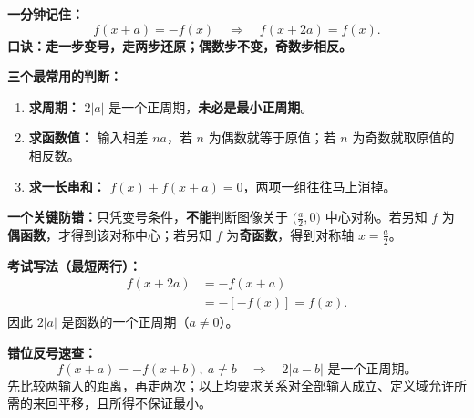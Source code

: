 \clearpage
\begin{summarybox}
\textbf{一分钟记住：}
\[
\boxed{\ f(x+a)=-f(x)\quad\Longrightarrow\quad f(x+2a)=f(x).\ }
\]
\textbf{口诀：走一步变号，走两步还原；偶数步不变，奇数步相反。}

\medskip
\textbf{三个最常用的判断：}
\begin{enumerate}[leftmargin=*,itemsep=0.3em]
\item \textbf{求周期：} $2|a|$ 是一个正周期，\textbf{未必是最小正周期}。
\item \textbf{求函数值：} 输入相差 $na$，若 $n$ 为偶数就等于原值；若 $n$ 为奇数就取原值的相反数。
\item \textbf{求一长串和：} $f(x)+f(x+a)=0$，两项一组往往马上消掉。
\end{enumerate}

\medskip
\textbf{一个关键防错：}只凭变号条件，\textbf{不能}判断图像关于 $\bigl(\frac a2,0\bigr)$ 中心对称。若另知 $f$ 为\textbf{偶函数}，才得到该对称中心；若另知 $f$ 为\textbf{奇函数}，得到对称轴 $x=\frac a2$。

\medskip
\textbf{考试写法（最短两行）：}
\[
\begin{aligned}
f(x+2a)&=-f(x+a)\\
&=-[-f(x)]=f(x).
\end{aligned}
\]
因此 $2|a|$ 是函数的一个正周期（$a\ne0$）。

\medskip
\textbf{错位反号速查：}
\[f(x+a)=-f(x+b),\ a\ne b
\quad\Longrightarrow\quad \boxed{2|a-b|\text{ 是一个正周期。}}\]
先比较两输入的距离，再走两次；以上均要求关系对全部输入成立、定义域允许所需的来回平移，且所得不保证最小。
\end{summarybox}
